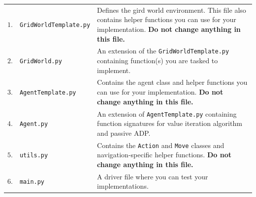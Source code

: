 \documentclass[12pt]{article}
\begin{document}
\begin{table}[ht!]
    \centering
    \begin{tabular}{llp{10.5cm}}
        $1.$ & \texttt{GridWorldTemplate.py} & Defines the gird world environment. This file also contains helper functions you can use for your implementation. \textbf{Do not change anything in this file.}\\[5pt]
        $2. $ & \texttt{GridWorld.py} & An extension of the \texttt{GridWorldTemplate.py} containing function(s) you are tasked to implement. \\[5pt]
        $3.$ & \texttt{AgentTemplate.py} & Contains the agent class and helper functions you can use for your implementation. \textbf{Do not change anything in this file.} \\[5pt]
        $4.$ & \texttt{Agent.py} & An extension of \texttt{AgentTemplate.py} containing function signatures for value iteration algorithm and passive ADP. \\[5pt]
        $5.$ & \texttt{utils.py} & Contains the \texttt{Action} and \texttt{Move} classes and navigation-specific helper functions. \textbf{Do not change anything in this file.} \\
        $6.$ & \texttt{main.py} & A driver file where you can test your implementations. \\
    \end{tabular}
    \label{tab:files_desc}
\end{table}
\end{document}
